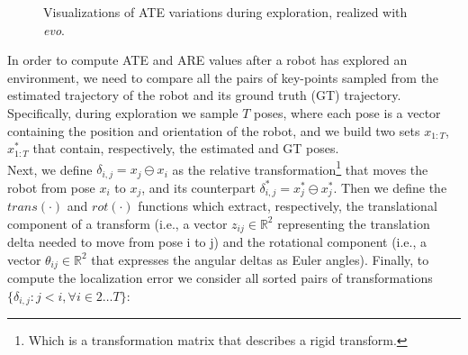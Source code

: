 \begin{figure}[ht!]
    \centering
        \hfill
    \caption{Visualizations of ATE variations during exploration, realized with \textit{evo}\protect\footnotemark.}\label{fig:APE_graphs}
    \end{figure}


\noindent
In order to compute ATE and ARE values after a robot has explored an environment, we need to compare all the pairs of key-points sampled from the estimated trajectory of the robot and its ground truth (GT) trajectory. Specifically, during exploration we sample $T$ poses, where each pose is a vector containing the position and orientation of the robot, and we build two sets $x_{1:T}$, $x_{1:T}^*$ that contain, respectively, the estimated and GT poses. \\
Next, we define $\delta_{i,j} = x_j\ominus x_i$ as the relative transformation\footnote{Which is a transformation matrix that describes a rigid transform.} that moves the robot from pose $x_i$ to $x_j$, and its counterpart $\delta_{i,j}^* = x_j^*\ominus x_j^*$. Then we define the $trans(\cdot)$ and $rot(\cdot)$ functions which extract, respectively, the translational component of a transform (i.e., a vector $z_{ij}\in\mathbb{R}^2$ representing the translation delta needed to move from pose i to j) and the rotational component (i.e., a vector $\theta_{ij}\in\mathbb{R}^2$ that expresses the angular deltas as Euler angles).
Finally, to compute the localization error we consider all sorted pairs of transformations $\{\delta_{i,j} : j < i, \forall i\in2\dots T\}$:

